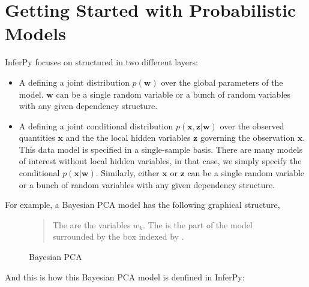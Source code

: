 \documentclass[letterpaper,10pt,english]{sphinxmanual}
\begin{document}
\section{Getting Started with Probabilistic Models}
\label{\detokenize{notes/guidemodels:getting-started-with-probabilistic-models}}
InferPy focuses on  structured
in two different layers:
\begin{itemize}
\item {} 
A  defining a joint distribution \(p(\mathbf{w})\)
over the global parameters of the model. \(\mathbf{w}\) can be a single random
variable or a bunch of random variables with any given dependency structure.

\item {} 
A  defining a joint conditional
distribution \(p(\mathbf{x},\mathbf{z}|\mathbf{w})\) over the observed quantities
\(\mathbf{x}\) and the the local hidden variables \(\mathbf{z}\) governing the
observation \(\mathbf{x}\). This data model is specified in a
single-sample basis. There are many models of interest without local
hidden variables, in that case, we simply specify the conditional
\(p(\mathbf{x}|\mathbf{w})\). Similarly, either \(\mathbf{x}\) or
\(\mathbf{z}\) can be a single random variable or a bunch of random variables
with any given dependency structure.

\end{itemize}

For example, a Bayesian PCA model has the following graphical structure,

\begin{figure}[htbp]
\centering
\capstart

\noindent{}
\caption{Bayesian PCA}
\begin{sphinxlegend}\begin{quote}

The  are the variables \(w_k\). The  is the part of the model surrounded by the box indexed by .
\end{quote}
\end{sphinxlegend}
\label{\detokenize{notes/guidemodels:id1}}\end{figure}

And this is how this Bayesian PCA model is denfined in InferPy:
\end{document}
